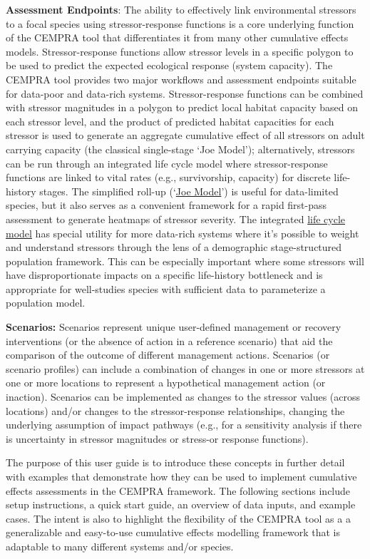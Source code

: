 \documentclass[
  letterpaper,
  DIV=11,
  numbers=noendperiod]{scrreprt}
\begin{document}
\textbf{Assessment Endpoints}: The ability to effectively link
environmental stressors to a focal species using stressor-response
functions is a core underlying function of the CEMPRA tool that
differentiates it from many other cumulative effects models.
Stressor-response functions allow stressor levels in a specific polygon
to be used to predict the expected ecological response (system
capacity). The CEMPRA tool provides two major workflows and assessment
endpoints suitable for data-poor and data-rich systems.
Stressor-response functions can be combined with stressor magnitudes in
a polygon to predict local habitat capacity based on each stressor
level, and the product of predicted habitat capacities for each stressor
is used to generate an aggregate cumulative effect of all stressors on
adult carrying capacity (the classical single-stage `Joe Model');
alternatively, stressors can be run through an integrated life cycle
model where stressor-response functions are linked to vital rates (e.g.,
survivorship, capacity) for discrete life-history stages. The simplified
roll-up (`\href{06_r_shiny_app.qmd}{Joe Model}') is useful for
data-limited species, but it also serves as a convenient framework for a
rapid first-pass assessment to generate heatmaps of stressor severity.
The integrated \href{07_life_cycle_model.qmd}{life cycle model} has
special utility for more data-rich systems where it's possible to weight
and understand stressors through the lens of a demographic
stage-structured population framework. This can be especially important
where some stressors will have disproportionate impacts on a specific
life-history bottleneck and is appropriate for well-studies species with
sufficient data to parameterize a population model.

\textbf{Scenarios:} Scenarios represent unique user-defined management
or recovery interventions (or the absence of action in a reference
scenario) that aid the comparison of the outcome of different management
actions. Scenarios (or scenario profiles) can include a combination of
changes in one or more stressors at one or more locations to represent a
hypothetical management action (or inaction). Scenarios can be
implemented as changes to the stressor values (across locations) and/or
changes to the stressor-response relationships, changing the underlying
assumption of impact pathways (e.g., for a sensitivity analysis if there
is uncertainty in stressor magnitudes or stress-or response functions).

The purpose of this user guide is to introduce these concepts in further
detail with examples that demonstrate how they can be used to implement
cumulative effects assessments in the CEMPRA framework. The following
sections include setup instructions, a quick start guide, an overview of
data inputs, and example cases. The intent is also to highlight the
flexibility of the CEMPRA tool as a a generalizable and easy-to-use
cumulative effects modelling framework that is adaptable to many
different systems and/or species.
\end{document}
